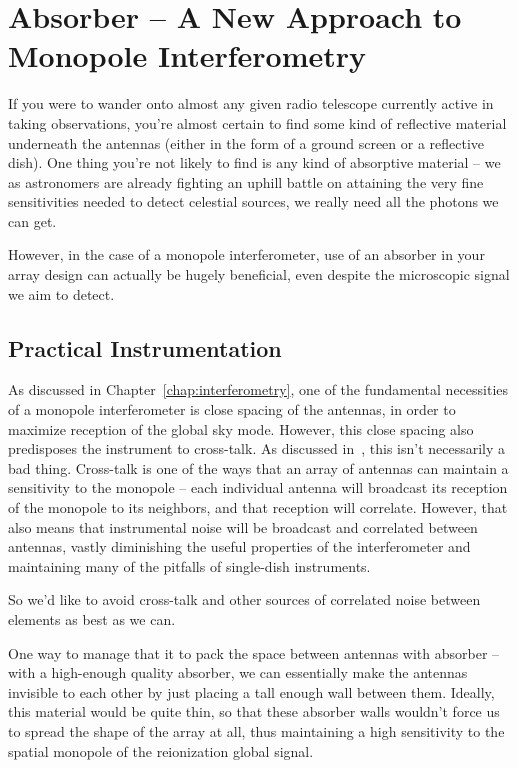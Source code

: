 \chapter{Absorber -- A New Approach to Monopole Interferometry}

If you were to wander onto almost any given radio telescope currently active in 
taking observations, you're almost certain to find some kind of reflective 
material underneath the antennas (either in the form of a ground screen or a 
reflective dish). One thing you're not likely to find is any kind of absorptive 
material -- we as astronomers are already fighting an uphill battle on 
attaining the very fine sensitivities needed to detect celestial sources, we 
really need all the photons we can get. 

However, in the case of a monopole interferometer, use of an absorber in your 
array design can actually be hugely beneficial, even despite the microscopic 
signal we aim to detect.

\section{Practical Instrumentation}

As discussed in Chapter~\ref{chap:interferometry}, one of the fundamental 
necessities of a monopole interferometer is close spacing of the antennas, in 
order to maximize reception of the global sky mode. However, this close spacing 
also predisposes the instrument to cross-talk. As discussed 
in~\citet{venumadhav2016}, this isn't necessarily a bad thing. Cross-talk is 
one of the ways that an array of antennas can maintain a sensitivity to the 
monopole -- each individual antenna will broadcast its reception of the 
monopole to its neighbors, and that reception will correlate. However, that 
also means that instrumental noise will be broadcast and correlated between 
antennas, vastly diminishing the useful properties of the interferometer and 
maintaining many of the pitfalls of single-dish instruments.

So we'd like to avoid cross-talk and other sources of correlated noise between 
elements as best as we can.

One way to manage that it to pack the space between antennas with absorber -- 
with a high-enough quality absorber, we can essentially make the antennas 
invisible to each other by just placing a tall enough wall between them.  
Ideally, this material would be quite thin, so that these absorber walls 
wouldn't force us to spread the shape of the array at all, thus maintaining a 
high sensitivity to the spatial monopole of the reionization global signal.

